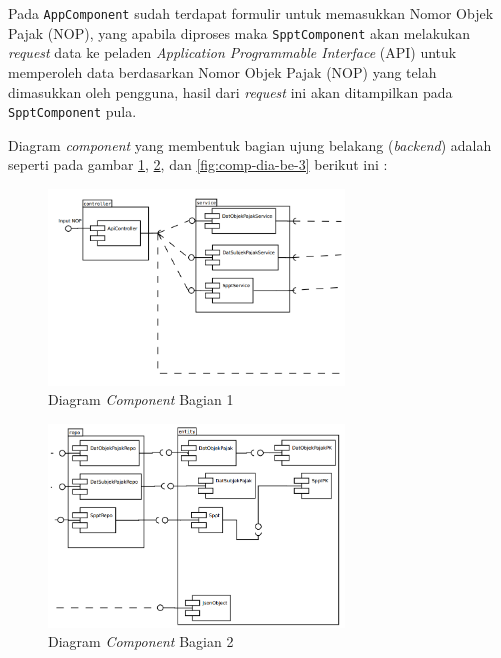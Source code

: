 Pada \texttt{AppComponent} sudah terdapat formulir untuk memasukkan Nomor Objek Pajak (NOP), yang apabila diproses maka \texttt{SpptComponent} akan melakukan \textit{request} data ke peladen \textit{Application Programmable Interface} (API) untuk memperoleh data berdasarkan Nomor Objek Pajak (NOP) yang telah dimasukkan oleh pengguna, hasil dari \textit{request} ini akan ditampilkan pada \texttt{SpptComponent} pula.

Diagram \textit{component} yang membentuk bagian ujung belakang (\textit{backend}) adalah seperti pada gambar \ref{fig:comp-dia-be-1}, \ref{fig:comp-dia-be-2}, dan \ref{fig:comp-dia-be-3} berikut ini :

\begin{figure}[H]
	\centering
	\includegraphics[width=0.7\textwidth]{./resources/uml/comp-dia-backend-1}
	\caption{Diagram \textit{Component} Bagian 1}
	\label{fig:comp-dia-be-1}
\end{figure}

\begin{figure}[H]
	\centering
	\includegraphics[width=0.7\textwidth]{./resources/uml/comp-dia-backend-2}
	\caption{Diagram \textit{Component} Bagian 2}
	\label{fig:comp-dia-be-2}
\end{figure}

